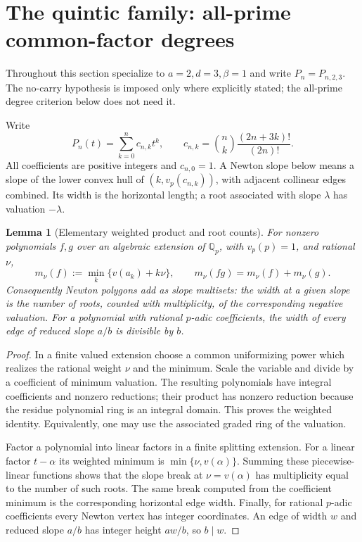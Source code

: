 \documentclass[11pt]{article}
\newtheorem{lemma}[theorem]{Lemma}
\begin{document}
\section{The quintic family: all-prime common-factor degrees}
Throughout this section specialize to $a=2,d=3,\beta=1$ and write
$P_n=P_{n,2,3}$. The no-carry hypothesis is imposed only where
explicitly stated; the all-prime degree criterion below does not need it.

Write
\[
 P_n(t)=\sum_{k=0}^n c_{n,k}t^k,\qquad
 c_{n,k}=\binom nk\frac{(2n+3k)!}{(2n)!}.
\]
All coefficients are positive integers and $c_{n,0}=1$.
A Newton slope below means a slope of the lower convex hull
of $(k,v_p(c_{n,k}))$, with adjacent collinear edges combined.
Its width is the horizontal length; a root associated with slope
$\lambda$ has valuation $-\lambda$.

\begin{lemma}[Elementary weighted product and root counts]\label{lem:quintic-weighted-newton-product}
For nonzero polynomials $f,g$ over an algebraic extension of
$\mathbb Q_p$, with $v_p(p)=1$, and rational $\nu$,
\[
 m_\nu(f):=\min_k\{v(a_k)+k\nu\},\qquad
 m_\nu(fg)=m_\nu(f)+m_\nu(g).
\]
Consequently Newton polygons add as slope multisets: the width at a
given slope is the number of roots, counted with multiplicity,
of the corresponding negative valuation.
For a polynomial with rational $p$-adic coefficients, the width
of every edge of reduced slope $a/b$ is divisible by $b$.
\end{lemma}
\begin{proof}
In a finite valued extension choose a common uniformizing power
which realizes the rational weight $\nu$ and the minimum.
Scale the variable and divide by a coefficient of minimum
valuation. The resulting polynomials have integral coefficients
and nonzero reductions; their product has nonzero reduction
because the residue polynomial ring is an integral domain.
This proves the weighted identity. Equivalently, one may use
the associated graded ring of the valuation.

Factor a polynomial into linear factors in a finite splitting
extension. For a linear factor $t-\alpha$ its weighted minimum is
$\min\{\nu,v(\alpha)\}$. Summing these piecewise-linear functions
shows that the slope break at $\nu=v(\alpha)$ has multiplicity
equal to the number of such roots. The same break computed
from the coefficient minimum is the corresponding horizontal
edge width. Finally, for rational $p$-adic coefficients every
Newton vertex has integer coordinates. An edge of width $w$
and reduced slope $a/b$ has integer height $aw/b$, so $b\mid w$.
\end{proof}
\end{document}
